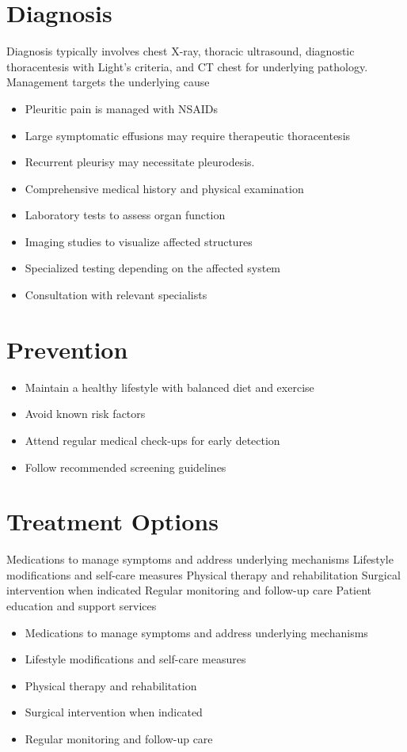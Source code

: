 \section{Diagnosis}
Diagnosis typically involves chest X-ray, thoracic ultrasound, diagnostic thoracentesis with Light's criteria, and CT chest for underlying pathology. Management targets the underlying cause

\begin{itemize}[noitemsep]
  \item Pleuritic pain is managed with NSAIDs
  \item Large symptomatic effusions may require therapeutic thoracentesis
  \item Recurrent pleurisy may necessitate pleurodesis.
  \item Comprehensive medical history and physical examination
  \item Laboratory tests to assess organ function
  \item Imaging studies to visualize affected structures
  \item Specialized testing depending on the affected system
  \item Consultation with relevant specialists
\end{itemize}
\section{Prevention}
\begin{itemize}[noitemsep]
  \item Maintain a healthy lifestyle with balanced diet and exercise
  \item Avoid known risk factors
  \item Attend regular medical check-ups for early detection
  \item Follow recommended screening guidelines
\end{itemize}
\section{Treatment Options}
Medications to manage symptoms and address underlying mechanisms Lifestyle modifications and self-care measures Physical therapy and rehabilitation Surgical intervention when indicated Regular monitoring and follow-up care Patient education and support services

\begin{itemize}[noitemsep]
  \item Medications to manage symptoms and address underlying mechanisms
  \item Lifestyle modifications and self-care measures
  \item Physical therapy and rehabilitation
  \item Surgical intervention when indicated
  \item Regular monitoring and follow-up care
\end{itemize}
